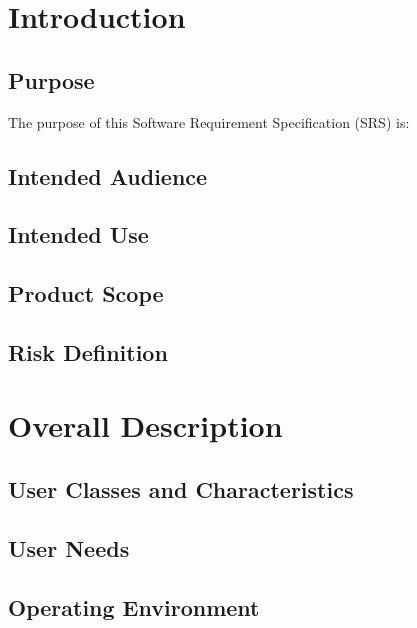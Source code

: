 \chapter{Introduction}
\label{ch:intro}
\section{Purpose }
\Large 
The purpose of this Software Requirement Specification (SRS) is:


\section{Intended Audience}
\Large {


}
\section{Intended Use}
\Large 

\section{Product Scope}

\section{Risk Definition}
\Large 



\newpage



\chapter{Overall Description}
\label{User story}
\section{User Classes and Characteristics}



\section{User Needs}
\Large{

}
\section{Operating Environment}




